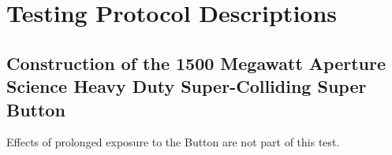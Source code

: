 \chapter{Testing Protocol Descriptions}
\label{sec:wavel-transf-sampl}
\section{Construction of the 1500 Megawatt Aperture Science Heavy Duty Super-Colliding Super Button
}
Effects of prolonged exposure to the Button are not part of this test.

